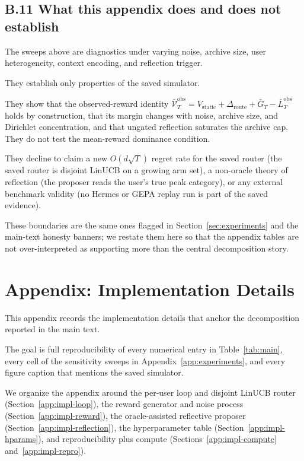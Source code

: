 \documentclass{article} %
\begin{document}
\subsection{B.11 What this appendix does and does not establish}

\label{app:what-not}

The sweeps above are diagnostics under varying noise, archive size, user
heterogeneity, context encoding, and reflection trigger.

They establish only properties of the saved simulator.

They show that the observed-reward identity
\(\bar{\mathcal V}_T^{\mathrm{obs}}
=V_{\mathrm{static}}+\Delta_{\mathrm{route}}+\bar G_T
-\bar L_T^{\mathrm{obs}}\) holds by construction, that its margin changes with
noise, archive size, and Dirichlet concentration, and that ungated reflection
saturates the archive cap. They do not test the mean-reward dominance
condition.

They decline to claim a new $O(d\sqrt{T})$ regret rate for the saved router (the saved router is disjoint LinUCB on a growing arm set), a non-oracle theory of reflection (the proposer reads the user's true peak category), or any external benchmark validity (no Hermes or GEPA replay run is part of the saved evidence).

These boundaries are the same ones flagged in Section~\ref{sec:experiments} and the main-text honesty banners; we restate them here so that the appendix tables are not over-interpreted as supporting more than the central decomposition story.

\section{Appendix: Implementation Details}

\label{app:implementation}

This appendix records the implementation details that anchor the decomposition reported in the main text.

The goal is full reproducibility of every numerical entry in Table~\ref{tab:main}, every cell of the sensitivity sweeps in Appendix~\ref{app:experiments}, and every figure caption that mentions the saved simulator.

We organize the appendix around the per-user loop and disjoint LinUCB router (Section~\ref{app:impl-loop}), the reward generator and noise process (Section~\ref{app:impl-reward}), the oracle-assisted reflective proposer (Section~\ref{app:impl-reflection}), the hyperparameter table (Section~\ref{app:impl-hparams}), and reproducibility plus compute (Sections~\ref{app:impl-compute} and~\ref{app:impl-repro}).
\end{document}
